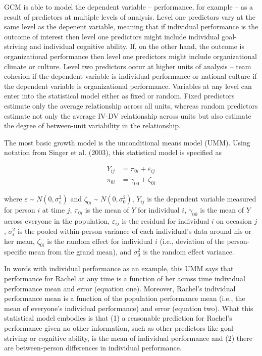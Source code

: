 \documentclass[english,,man]{apa6}
\begin{document}
GCM is able to model the dependent variable -- performance, for example -- as a result of predictors at multiple levels of analysis. Level one predictors vary at the same level as the depenent variable, meaning that if individual performance is the outcome of interest then level one predictors might include individual goal-striving and individual cognitive ability. If, on the other hand, the outcome is organizational performance then level one predictors might include organizational climate or culture. Level two predictors occur at higher units of analysis -- team cohesion if the dependent variable is individual performance or national culture if the dependent variable is organizational performance. Variables at any level can enter into the statistical model either as fixed or random. Fixed predictors estimate only the average relationship across all units, whereas random predictors estimate not only the average IV-DV relationship across units but also estimate the degree of between-unit variability in the relationship.

The most basic growth model is the unconditional means model (UMM). Using notation from Singer et al. (2003), this statistical model is specified as

\begin{align}
\label{UMM}
Y_{ij} &= \pi_{0i} + \varepsilon_{ij} \\
\pi_{0i} &= \gamma_{00} + \zeta_{0i}
\end{align}

\noindent where \(\varepsilon\) \textasciitilde{} \(N(0, \sigma_{\varepsilon}^2)\) and \(\zeta_{0i}\) \textasciitilde{} \(N(0, \sigma_{0}^2)\), \(Y_{ij}\) is the dependent variable measured for person \(i\) at time \(j\), \(\pi_{0i}\) is the mean of \(Y\) for individual \(i\), \(\gamma_{00}\) is the mean of \(Y\) across everyone in the population, \(\varepsilon_{ij}\) is the residual for individual \(i\) on occasion \(j\), \(\sigma_{\varepsilon}^2\) is the pooled within-person variance of each individual's data around his or her mean, \(\zeta_{0i}\) is the random effect for individual \(i\) (i.e., deviation of the person-specific mean from the grand mean), and \(\sigma_0^2\) is the random effect variance.

In words with individual performance as an example, this UMM says that performance for Rachel at any time is a function of her across time individual performance mean and error (equation one). Moreover, Rachel's individual performance mean is a function of the population performance mean (i.e., the mean of everyone's individual performance) and error (equation two). What this statistical model embodies is that (1) a reasonable prediction for Rachel's performance given no other information, such as other predictors like goal-striving or cognitive ability, is the mean of individual performance and (2) there are between-person differences in individual performance.
\end{document}
